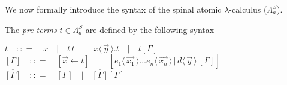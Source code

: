 \documentclass[a4paper,UKenglish,cleveref, autoref]{lipics-v2019}
\newcommand{\FALC}{\Lambda^{S}_{a}}
\newcommand{\app}[2]{#1 \, #2}
\newcommand{\fake}[3]{#1 \langle \, #2 \, \rangle . #3}
\newcommand{\dist}[5]{#1 [ #2 \, \vert \, \fakedist{#4}{#5} \, #3 ]}
\newcommand{\fakedist}[2]{#1 \langle \, #2 \, \rangle}
\newcommand{\sharerule}{\triangle}
\begin{document}
%

We now formally introduce the syntax of the spinal atomic $\lambda$-calculus ($\FALC$).

\begin{definition} The \emph{pre-terms} $t \in \FALC$ are defined by the following syntax

\begin{center}
$t \quad {:}{:}{=} \quad x \quad \vert \quad \app{t}{t} \quad \vert \quad \fake{x}{\vec{y}}{t} \quad \vert \quad t[\Gamma]$ 
\\[0.2cm]
$[\Gamma] \quad {:}{:}{=} \quad  [\vec{x} \leftarrow t] \quad \vert \quad \dist{}{\fakedist{e_{1}}{\vec{x_{1}}} \dots \fakedist{e_{n}}{\vec{x_{n}}}}{\overline{[\Gamma]}}{d}{\vec{y}}$  
\\[0.2cm]
$\overline{[\Gamma]} \quad {:}{:}{=} \quad [\Gamma] \quad \vert \quad \overline{[\Gamma]}[\Gamma]$
\end{center}

\end{definition}
\end{document}

